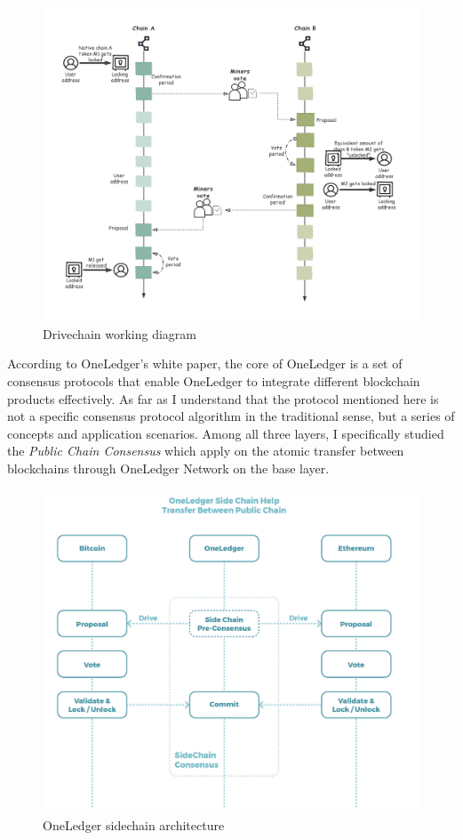         \begin{figure}[H]
        \includegraphics[width=1\textwidth]{./figures/drive.png}
        \centering
        \caption{Drivechain  working diagram}%
        \centering
        \label{fig:drive}
        \end{figure}
\noindent According to OneLedger's white paper, the core of OneLedger is a set of consensus protocols that enable OneLedger to integrate different blockchain products effectively. As far as I understand that the protocol mentioned here is not a specific consensus protocol algorithm in the traditional sense, but a series of concepts and application scenarios. Among all three layers, I specifically studied the \textit{Public Chain Consensus} which apply on the atomic transfer between blockchains through OneLedger Network on the base layer.
        \begin{figure}[H]
        \includegraphics[width=1\textwidth]{./figures/oneledger.png}
        \centering
        \caption{{OneLedger sidechain architecture}\protect\footnotemark}
        \centering
        \label{fig:oneledger}
        
        \end{figure}
